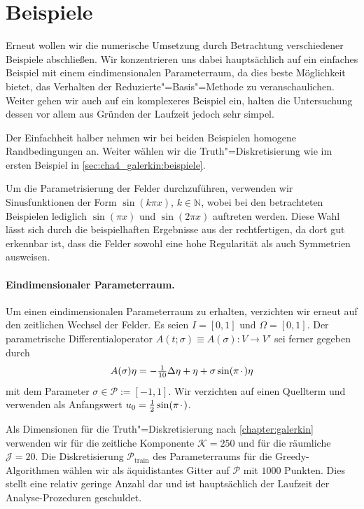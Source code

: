 \documentclass[../main.tex]{subfiles}
\begin{document}
\section{Beispiele} %
\label{sec:cha5_rbm:beispiele}

Erneut wollen wir die numerische Umsetzung durch Betrachtung verschiedener Beispiele abschließen.
Wir konzentrieren uns dabei hauptsächlich auf ein einfaches Beispiel mit einem eindimensionalen Parameterraum, da dies beste Möglichkeit bietet, das Verhalten der Reduzierte"=Basis"=Methode zu veranschaulichen.
Weiter gehen wir auch auf ein komplexeres Beispiel ein, halten die Untersuchung dessen vor allem aus Gründen der Laufzeit jedoch sehr simpel.

Der Einfachheit halber nehmen wir bei beiden Beispielen homogene Randbedingungen an.
Weiter wählen wir die Truth"=Diskretisierung wie im ersten Beispiel in \cref{sec:cha4_galerkin:beispiele}.

Um die Parametrisierung der Felder durchzuführen, verwenden wir Sinusfunktionen der Form $\sin(k \pi x)$, $k \in \mathbb{N}$, wobei bei den betrachteten Beispielen lediglich $\sin(\pi x)$ und $\sin(2 \pi x)$ auftreten werden.
Diese Wahl lässt sich durch die beispielhaften Ergebnisse aus der  rechtfertigen, da dort gut erkennbar ist, dass die Felder sowohl eine hohe Regularität als auch Symmetrien ausweisen.

\paragraph{Eindimensionaler Parameterraum.} %

Um einen eindimensionalen Parameterraum zu erhalten, verzichten wir erneut auf den zeitlichen Wechsel der Felder.
Es seien $I = [0, 1]$ und $\Omega = [0, 1]$.
Der parametrische Differentialoperator $A(t; \sigma) \equiv A(\sigma) \colon V \to V'$ sei ferner gegeben durch
\begin{equation}
    A(\sigma) \eta = - \tfrac{1}{10} \Delta \eta + \eta + \sigma \sin(\pi {\mkern2mu\cdot\mkern2mu}) \eta
\end{equation}
mit dem Parameter $\sigma \in \mathcal P := [-1, 1]$.
Wir verzichten auf einen Quellterm und verwenden als Anfangswert $u_{0} = \tfrac{1}{2} \sin(\pi {\mkern2mu\cdot\mkern2mu})$.

Als Dimensionen für die Truth"=Diskretisierung nach \cref{chapter:galerkin} verwenden wir für die zeitliche Komponente $\mathcal K = 250$ und für die räumliche $\mathcal J = 20$.
Die Diskretisierung $\mathcal P_{\mathrm{train}}$ des Parameterraums für die Greedy-Algorithmen wählen wir als äquidistantes Gitter auf $\mathcal P$ mit $1000$ Punkten.
Dies stellt eine relativ geringe Anzahl dar und ist hauptsächlich der Laufzeit der Analyse-Prozeduren geschuldet.
\end{document}

